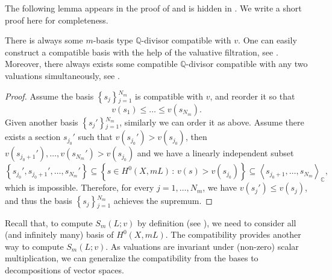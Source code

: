 \documentclass[11pt, oneside]{amsart}
\newtheorem{lemma}[theorem]{Lemma}
\def\mid{\,:\,} %
\def\{{\mathopen{}\left\lbrace} \def\}{\right\rbrace\mathclose{}}
\newcommand{\<}{\left\langle} \renewcommand{\>}{\right\rangle}
\let\oldbigoplus\bigoplus
\renewcommand{\bigoplus}{\oldbigoplus\limits}
\let\oldsum\sum
\renewcommand{\sum}{\oldsum\limits}
\begin{document}
The following lemma appears in the proof of \cite[Proposition 3.1]{AZ_Kstab_fano_flag} and is hidden in \cite[\S2.6 and Lemma 3.5]{BJ_thre_val_kst}. We write a short proof here for completeness.
\begin{remark*}
	There is always some $m$-basis type $\mathbb{Q}$-divisor compatible with $v$. One can easily construct a compatible basis with the help of the valuative filtration, see \cite[\S3.1]{BJ_thre_val_kst}. Moreover, there always exists some compatible $\mathbb{Q}$-divisor compatible with any two valuations simultaneously, see \cite[Lemma 3.1]{AZ_Kstab_fano_flag}.
\end{remark*}
\begin{proof}
	Assume the basis $\{s_j\}_{j = 1}^{N_m}$ is compatible with $v$, and reorder it so that
	\begin{equation*}
		v(s_1) \leq \dots \leq v(s_{N_m}).
	\end{equation*}
	Given another basis $\{s_j'\}_{j = 1}^{N_m}$, similarly we can order it as above. Assume there exists a section $s_{j_0}'$ such that $v(s_{j_0}') > v(s_{j_0})$, then $v(s_{j_0 + 1}'), \dots, v(s_{N_m}') > v(s_{j_0})$ and we have a linearly independent subset
	\begin{equation*}
		\{s_{j_0}', s_{j_0 + 1}', \dots, s_{N_m}'\} \subseteq \{s \in H^0(X, m L) \mid v(s) > v(s_{j_0})\} \subseteq \<s_{j_0 + 1}, \dots, s_{N_m}\>_\mathbb{C},
	\end{equation*}
	which is impossible. Therefore, for every $j = 1, \dots, N_m$, we have $v(s_j') \leq v(s_j)$, and thus the basis $\{s_j\}_{j = 1}^{N_m}$ achieves the supremum.
\end{proof}


Recall that, to compute $S_m(L; v)$ by definition (see ), we need to consider all (and infinitely many) basis of $H^0(X, m L)$. The compatibility provides another way to compute $S_m(L; v)$. As valuations are invariant under (non-zero) scalar multiplication, we can generalize the compatibility from the bases to decompositions of vector spaces.
\end{document}
